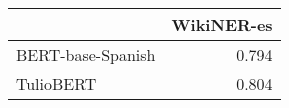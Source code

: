 \begin{tabular}{lr}
\toprule
 & WikiNER-es \\
\midrule
BERT-base-Spanish & 0.794 \\
TulioBERT & 0.804 \\
\bottomrule
\end{tabular}

